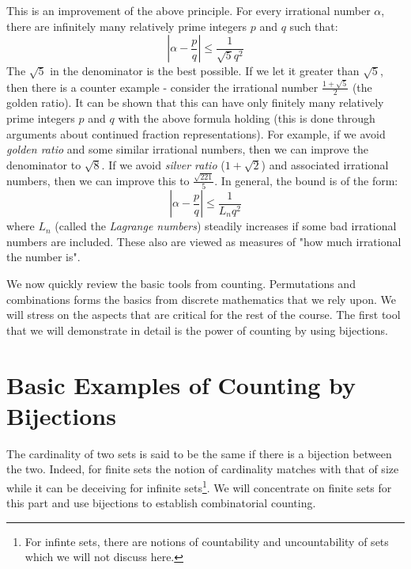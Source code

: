 \begin{curiosity}
This is an improvement of the above principle. For every irrational number $\alpha$, there are infinitely many relatively prime integers $p$ and $q$ such that:
$$\left| \alpha - \frac{p}{q} \right| \le \frac{1}{\sqrt{5}q^2}$$
The $\sqrt{5}$ in the denominator is the best possible. If we let it greater than $\sqrt{5}$, then there is a counter example - consider the irrational number $\frac{1+\sqrt{5}}{2}$ (the golden ratio). It can be shown that this can have only finitely many relatively prime integers $p$ and $q$ with the above formula holding (this is done through arguments about continued fraction representations). For example, if we avoid \textit{golden ratio} and some similar irrational numbers, then we can improve the denominator to $\sqrt{8}$. If we avoid \textit{silver ratio} ($1+\sqrt{2}$) and associated irrational numbers, then we can improve this to $\frac{\sqrt{221}}{5}$. In general, the bound is of the form:
$$\left| \alpha - \frac{p}{q} \right| \le \frac{1}{L_nq^2}$$
where $L_n$ (called the \textit{Lagrange numbers}) steadily increases if some bad irrational numbers are included. These also are viewed as measures of "how much irrational the number is". 
\end{curiosity}


We now quickly review the basic tools from counting. Permutations and combinations forms the basics from discrete mathematics that we rely upon. We will stress on the aspects that are critical for the rest of the course. The first tool that we will demonstrate in detail is the power of counting by using bijections.

\section{Basic Examples of Counting by Bijections}

The cardinality of two sets is said to be the same if there is a bijection between the two. Indeed, for finite sets the notion of cardinality matches with that of size while it can be deceiving for infinite sets\footnote{For infinte sets, there are notions of countability and uncountability of sets which we will not discuss here.}. We will concentrate on finite sets for this part and use bijections to establish combinatorial counting.

